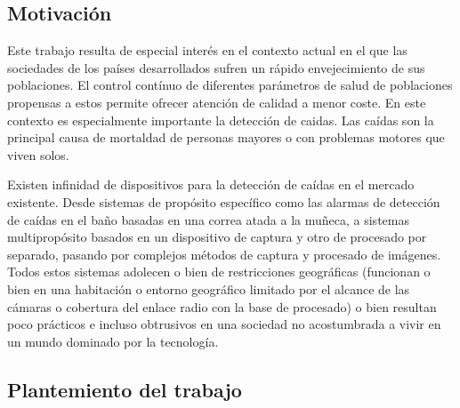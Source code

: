 \documentclass[../tfm.tex]{subfiles}
\begin{document}

\subsection{Motivación}

Este trabajo resulta de especial interés en el contexto actual en el que las sociedades de los países desarrollados sufren un rápido envejecimiento de sus poblaciones. El control contínuo de diferentes parámetros de salud de poblaciones propensas a estos permite ofrecer atención de calidad a menor coste. En este contexto es especialmente importante la detección de caidas. Las caídas son la principal causa de mortaldad de personas mayores o con problemas motores que viven solos.

Existen infinidad de dispositivos para la detección de caídas en el mercado existente. Desde sistemas de propósito específico como las alarmas de detección de caídas en el baño basadas en una correa atada a la muñeca, a sistemas multipropósito basados en un dispositivo de captura y otro de procesado por separado, pasando por complejos métodos de captura y procesado de imágenes. Todos estos sistemas adolecen o bien de restricciones geográficas (funcionan o bien en una habitación o entorno geográfico limitado por el alcance de las cámaras o cobertura del enlace radio con la base de procesado) o bien resultan poco prácticos e incluso obtrusivos en una sociedad no acostumbrada a vivir en un mundo dominado por la tecnología.

\subsection{Plantemiento del trabajo}
\end{document}
